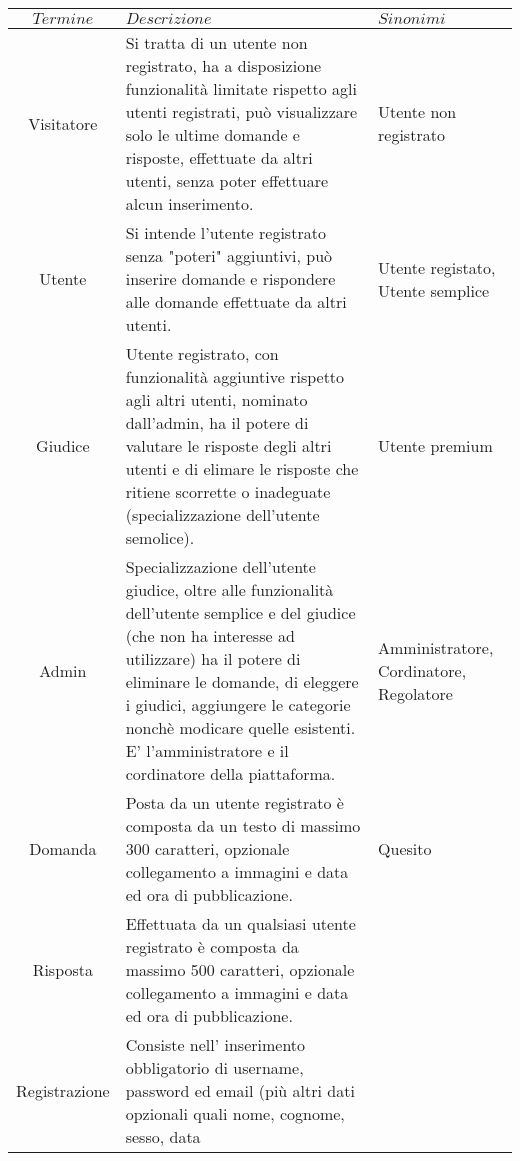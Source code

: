 \documentclass[paper=a4, fontsize=11pt]{scrartcl}
\numberwithin{equation}{section}		%
\numberwithin{figure}{section}			%
\numberwithin{table}{section}				%
\begin{document}
	\begin{table}[H]
    \centering
    \begin{tabular}{c p{9cm} p{4cm} } \toprule
    {$Termine$}  & {$Descrizione$} & {$Sinonimi$} \\ \midrule
    Visitatore & Si tratta di un utente non registrato, ha a disposizione funzionalità limitate rispetto agli utenti registrati, può visualizzare solo le ultime domande e risposte,
    effettuate da altri utenti, senza poter effettuare alcun inserimento. & Utente non registrato\\
    Utente & Si intende l'utente registrato senza "poteri" aggiuntivi, può inserire domande e rispondere alle domande effettuate da altri utenti. & Utente registato, Utente semplice\\
    Giudice & Utente registrato, con funzionalità aggiuntive rispetto               
                                    agli altri utenti, nominato dall'admin, ha il potere di valutare
                                    le risposte degli altri utenti e di elimare le risposte che 
                                    ritiene scorrette o inadeguate (specializzazione dell'utente
                                    semolice).
    & Utente premium\\
    Admin & Specializzazione dell'utente giudice, oltre alle funzionalità        
                                    dell'utente semplice e del giudice (che non ha interesse ad 
                                    utilizzare) ha il potere di eliminare le domande, di eleggere
                                    i giudici, aggiungere le categorie nonchè modicare quelle 
                                    esistenti. E' l'amministratore e il cordinatore della piattaforma. & Amministratore, Cordinatore, Regolatore\\
    Domanda & Posta da un utente registrato è composta da un testo di massimo       
                                    300 caratteri, opzionale collegamento a immagini e data ed ora 
                                    di pubblicazione.   & Quesito\\
    Risposta & Effettuata da un qualsiasi utente registrato è composta da massimo    
                                    500 caratteri, opzionale collegamento a immagini e data ed ora 
                                    di pubblicazione. & \\
    Registrazione & Consiste nell' inserimento obbligatorio di username, password ed       
                                    email (più altri dati opzionali quali nome, cognome, sesso, data

\end{tabular}
\end{table}
\end{document}
